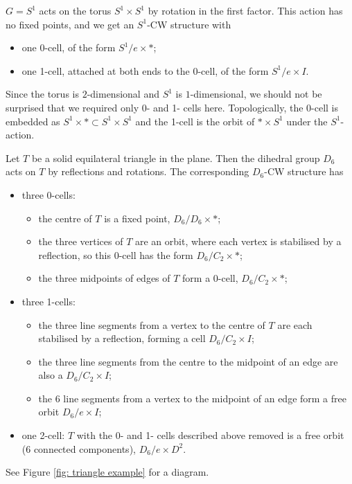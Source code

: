 \begin{example}
    $G = S^1$ acts on the torus $S^1 \times S^1$ by rotation in the first factor. This action has no fixed points, and we get an $S^1$-CW structure with
    \begin{itemize}
        \item one 0-cell, of the form $S^1/e \times *$;
        \item one 1-cell, attached at both ends to the 0-cell, of the form $S^1/e \times I$.
      \end{itemize}
      Since the torus is $2$-dimensional and $S^1$ is $1$-dimensional, we should not be surprised that we required only 0- and 1- cells here. Topologically, the 0-cell is embedded as $S^1 \times * \subset S^1 \times S^1$ and the 1-cell is the orbit of $* \times S^1$ under the $S^1$-action. 
\end{example}

\begin{example}
    Let $T$ be a solid equilateral triangle in the plane. Then the dihedral group $D_6$ acts on $T$ by reflections and rotations. The corresponding $D_6$-CW structure has
    \begin{itemize}
        \item three 0-cells:
        \begin{itemize}
            \item the centre of $T$ is a fixed point, $D_6/D_6 \times *$;
            \item the three vertices of $T$ are an orbit, where each vertex is stabilised by a reflection, so this 0-cell has the form $D_6/C_2 \times *$;
            \item the three midpoints of edges of $T$ form a $0$-cell, $D_6/C_2 \times *$;
        \end{itemize}
        \item three 1-cells:
        \begin{itemize}
            \item the three line segments from a vertex to the centre of $T$ are each stabilised by a reflection, forming a cell $D_6/C_2 \times I$;
            \item the three line segments from the centre to the midpoint of an edge are also a $D_6/C_2 \times I$;
            \item the 6 line segments from a vertex to the midpoint of an edge form a free orbit $D_6/e \times I$;
        \end{itemize}
        \item one 2-cell: $T$ with the 0- and 1- cells described above removed is a free orbit (6 connected components), $D_6/e \times D^2$.
    \end{itemize}
    See Figure \ref{fig: triangle example} for a diagram.
\end{example}

